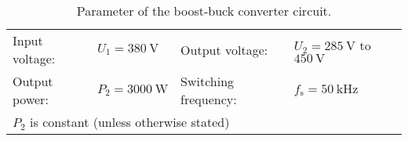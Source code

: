 
\begin{table}[ht]
    \centering  %
    \begin{tabular}{llll}
        \toprule
        
        Input voltage: &  $U_{\mathrm{1}} = \SI{380}{\volt}$ & Output voltage: & $U_{\mathrm{2}} = \SI{285}{\volt}$  to $\SI{450}{\volt}$\\ 
        Output power: & $P_{\mathrm{2}} = \SI{3000}{\watt}$ & Switching frequency: & $f_{\mathrm{s}} = \SI{50}{\kilo\hertz}$ \\ 
        \multicolumn{4}{l}{$P_{\mathrm{2}}$ is constant (unless otherwise stated)} \\
        \bottomrule
    \end{tabular}
    \caption{Parameter of the  boost-buck converter circuit.}  %
    \label{table:ParametersOfBoostBuckConverter}
\end{table}